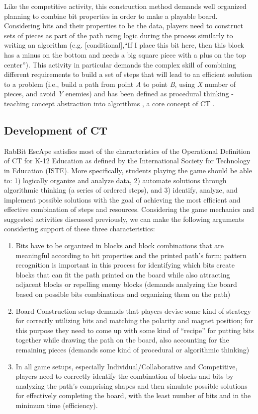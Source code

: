 \documentclass{acm_proc_article-sp}
\begin{document}
Like the competitive activity, this construction method demands well organized planning to combine bit properties in order to make a playable board.
Considering bits and their properties to be the data, players need to construct sets of pieces as part of the path using logic during the process similarly to writing an algorithm (e.g. [conditional],``If I place this bit here, then this block has a minus on the bottom and needs a big square piece with a plus on the top center'').
This activity in particular demands the complex skill of combining different requirements to build a set of steps that will lead to an efficient solution to a problem (i.e., build a path from point \textit{A} to point \textit{B}, using \textit{X} number of pieces, and avoid \textit{Y} enemies) and has been defined as procedural thinking - teaching concept abstraction into algorithms \cite{papert1980mindstorms}, a core concept of CT \cite{national2010report}.

\subsection{Development of CT}
\label{sec:developing_ct}
RabBit EscApe satisfies most of the characteristics of the Operational Definition of CT for K-12 Education as defined by the International Society for Technology in Education (ISTE)\cite{operationalct}. 
More specifically, students playing the game should be able to: 1) logically organize and analyze data, 2) automate solutions through algorithmic thinking (a series of ordered steps), and 3) identify, analyze, and implement possible solutions with the goal of achieving the most efficient and effective combination of steps and resources. 
Considering the game mechanics and suggested activities discussed previously, we can make the following arguments considering support of these three characteristics:

\begin{enumerate}
\item{Bits have to be organized in blocks and block combinations that are meaningful according to bit properties and the printed path's form; pattern recognition is important in this process for identifying which bits create blocks that can fit the path printed on the board while also attracting adjacent blocks or repelling enemy blocks (demands analyzing the board based on possible bits combinations and organizing them on the path)}
\item{Board Construction setup demands that players devise some kind of strategy for correctly utilizing bits and matching the polarity and magnet position; for this purpose they need to come up with some kind of ``recipe'' for putting bits together while drawing the path on the board, also accounting for the remaining pieces (demands some kind of procedural or algorithmic thinking)}
\item{In all game setups, especially Individual/Collaborative and Competitive, players need to correctly identify the combination of blocks and bits by analyzing the path's comprising shapes and then simulate possible solutions for effectively completing the board, with the least number of bits and in the minimum time (efficiency).}
\end{enumerate}
\end{document}
